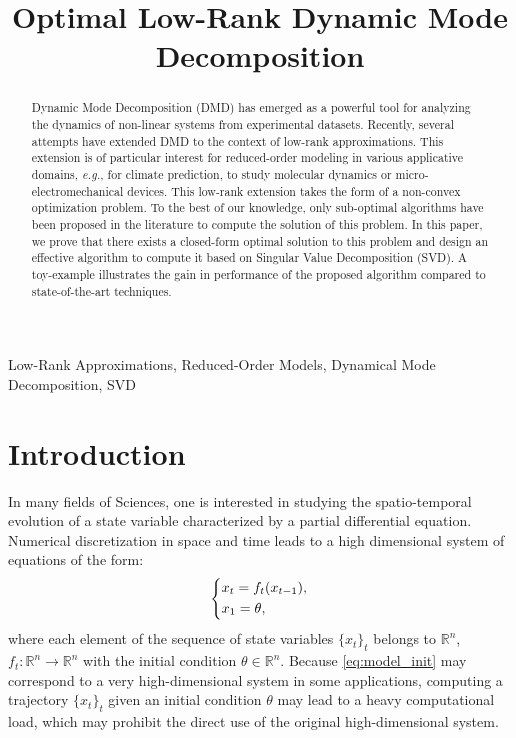 \documentclass{article}
\title{Optimal Low-Rank Dynamic Mode Decomposition}
\newcommand{\Rr}{\mathds{R}}
\newcommand{\Sc}{\mathcal{S}}
\newcommand{\Tc}{\mathcal{T}}
\newcommand{\eg}{\textit{e.g.}, }
\begin{document}
%
\maketitle
%
\begin{abstract}
Dynamic Mode Decomposition (DMD) has  emerged as a powerful tool for analyzing  the dynamics of non-linear systems from experimental datasets. Recently, several attempts have extended   DMD to the context of low-rank approximations. This extension is of particular interest for reduced-order modeling in various applicative domains, \eg for climate prediction, to study  molecular dynamics or micro-electromechanical devices.    This low-rank  extension takes the form of a non-convex optimization problem. 
To the best of our knowledge, only  sub-optimal algorithms have been proposed in the literature to compute the solution of this problem. In this paper, we prove that there exists a closed-form optimal solution to this problem and design an effective algorithm to compute it based  on Singular Value Decomposition (SVD). A toy-example illustrates the gain in performance  of  the proposed algorithm compared to  state-of-the-art techniques.
\end{abstract}
%
\begin{keywords}
Low-Rank Approximations, Reduced-Order Models, Dynamical Mode Decomposition, SVD
\end{keywords}
%

\section{Introduction}


In many fields of Sciences, one is interested in studying the {spatio-temporal} evolution of a state variable characterized by  a  partial differential equation.  Numerical discretization in space and time leads to a high dimensional system of equations {of the form:} \vspace{-0.cm}
\begin{align}\label{eq:model_init} 
 \left\{\begin{aligned}
& x_{t}= f_t(x_{t-1}) , \\%
&x_1={\theta},
\end{aligned}\right. \vspace{-0.cm}%
\end{align} 
\noindent
 {where} each element   of the sequence of state variables  $\{x_t\}_t$ belongs to $\Rr^n$,   $f_t:\Rr^n \to \Rr^n$ with the initial condition  $\theta \in \Rr^n$. %
 {Because \eqref{eq:model_init} may correspond to a very high-dimensional system in some applications, computing a trajectory $\{x_t\}_t$ given an initial condition ${\theta}$}  may  lead to a heavy computational load, which may prohibit the direct use of the original high-dimensional system.  
 
\end{document}
